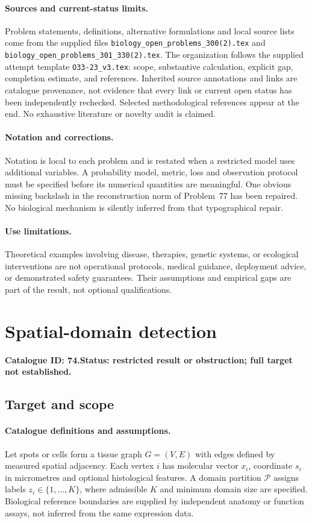 \documentclass[11pt]{article}
\begin{document}
\paragraph{Sources and current-status limits.}
Problem statements, definitions, alternative formulations and local source lists
come from the supplied files
\texttt{biology\_open\_problems\_300(2).tex} and
\texttt{biology\_open\_problems\_301\_330(2).tex}.
The organization follows the supplied attempt template
\texttt{O33-23\_v3.tex}: scope, substantive calculation, explicit gap,
completion estimate, and references. Inherited source annotations and links are
catalogue provenance, not evidence that every link or current open status has
been independently rechecked. Selected methodological references appear at the
end. No exhaustive literature or novelty audit is claimed.

\paragraph{Notation and corrections.}
Notation is local to each problem and is restated when a restricted model uses
additional variables. A probability model, metric, loss and observation protocol
must be specified before its numerical quantities are meaningful. One obvious
missing backslash in the reconstruction norm of Problem~77 has been repaired.
No biological mechanism is silently inferred from that typographical repair.

\paragraph{Use limitations.}
Theoretical examples involving disease, therapies, genetic systems, or ecological
interventions are not operational protocols, medical guidance, deployment advice,
or demonstrated safety guarantees. Their assumptions and empirical gaps are part
of the result, not optional qualifications.

\setcounter{section}{73}
\section{Spatial-domain detection}
\label{prob:074}
\noindent\textbf{Catalogue ID: 74.}\quad \textbf{Status: restricted result or obstruction; full target not established.}
\subsection{Target and scope}
\paragraph{Catalogue definitions and assumptions.}
Let spots or cells form a tissue graph $G=(V,E)$ with edges defined by measured spatial adjacency. Each vertex $i$ has molecular vector $x_i$, coordinate $s_i$ in micrometres and optional histological features. A domain partition $\mathcal P$ assigns labels $z_i\in\{1,\ldots,K\}$, where admissible $K$ and minimum domain size are specified. Biological reference boundaries are supplied by independent anatomy or function assays, not inferred from the same expression data.
\end{document}

